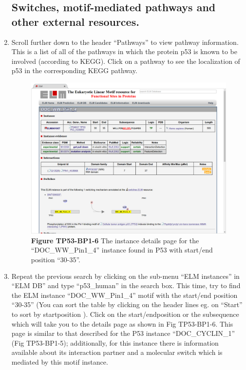 \begin{enumerate}
%
%
\subsection{Switches, motif-mediated pathways and other external resources.}
\label{subsec:explore_content_external_resoureces}

\item Scroll further down to the header ``Pathways'' to view pathway
	information. This is a list of all of the pathways in which the protein
	p53 is known to be involved (according to KEGG). Click on a pathway to
	see the localization of p53 in the corresponding KEGG pathway.

\begin{figure}[h!]
	\centering
	\includegraphics[width=\textwidth]{Figures/explore_content/doc_ww_pin_1_4_instance.png}
	\caption{
	\textbf{Figure TP53-BP1-6}
	The instance details page for the
	``DOC\_WW\_Pin1\_4'' instance found in P53 with start/end position
	``30-35''.
	}
	\label{fig:explore_content_doc_ww_instance}
\end{figure}

\item Repeat the previous search by clicking on the sub-menu ``ELM instances''
	in ``ELM DB'' and type ``p53\_human'' in the search box.  This time,
	try to find the ELM instance ``DOC\_WW\_Pin1\_4'' motif with the
	start/end position ``30-35'' (You can sort the table by clicking on the
	header lines eg. on ``Start'' to sort by startposition ). Click on the
	start/endposition or the subsequence which will take you to the details
	page as shown in Fig TP53-BP1-6. This page is similar to that described
	for the P53 instance ``DOC\_CYCLIN\_1'' (Fig TP53-BP1-5); additionally,
	for this instance there is information available about its interaction
	partner and a molecular switch which is mediated by this motif
	instance.


\end{enumerate}
